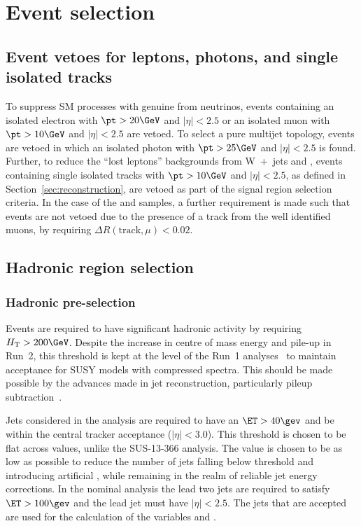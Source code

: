 \section{Event selection}
\label{sec:selection}

\subsection{Event vetoes for leptons, photons, and single isolated tracks\label{sec:vetoes}}

To suppress SM processes with genuine \met from neutrinos, events
containing an isolated electron with $\pt > 20\GeV$ and $|\eta| < 2.5$ or an isolated muon
with $\pt > 10\GeV$ and $|\eta| < 2.5$ are vetoed. To select a pure
multijet topology, events are vetoed in which an isolated
photon with $\pt > 25\GeV$ and $|\eta| < 2.5$ is
found.  Further, to reduce the ``lost leptons'' backgrounds from W~+~jets 
and \ttbar, events containing single isolated tracks with $\pt >
10\GeV$ and $|\eta| < 2.5$, as defined in
Section~\ref{sec:reconstruction}, are vetoed as part of the signal
region selection criteria. In the case of the \mj and \mmj
samples, a further requirement is made such that events are not vetoed
due to the presence of a track from the well identified muons, by
requiring $\Delta R(\textrm{track},\mu) < 0.02$.


\subsection{Hadronic region selection}

\subsubsection{Hadronic pre-selection}
Events are required to have significant hadronic activity by requiring
$\scalht > 200\GeV$. Despite the increase in centre of mass energy and pile-up
in Run~2, this threshold is kept at the level of the Run~1 analyses~\cite{run1Analyses}  
to maintain acceptance for SUSY models with compressed spectra. This should be
made possible by the advances made in jet reconstruction, particularly pileup
subtraction~\cite{puppi}.

Jets considered in the analysis are required to have an $\ET>40\gev$ and be
within the central tracker acceptance ($|\eta|<3.0$). This threshold is chosen
to be flat across \HT values, unlike the SUS-13-366 analysis. The \ET value is
chosen to be as low as possible to reduce the number of jets falling below
threshold and introducing artificial \mht, while remaining in the realm of
reliable jet energy corrections. In the nominal analysis the lead two jets 
are required to satisfy $\ET>100\gev$ and the lead jet must
have $|\eta|<2.5$. The jets that are accepted are used for the calculation of
the variables \HT and \mht.

